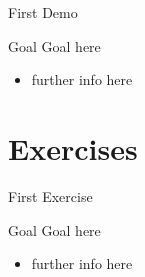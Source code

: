 \documentclass[presentation]{beamer}\mode<presentation>{\usetheme{AMSBolognaFC}}
\begin{document}
\begin{frame}{First Demo}
	\begin{block}{Goal}
		Goal here
	\end{block}
	\begin{itemize}
		\item further info here
	\end{itemize}
\end{frame}

\section{Exercises}

\begin{frame}{First Exercise}
	\begin{block}{Goal}
		Goal here
	\end{block}
	\begin{itemize}
		\item further info here
	\end{itemize}
\end{frame}

\section*{}

\frame{\titlepage}

\section*{\refname}

\begin{frame}[c,noframenumbering]{\refname}
	\scriptsize
	\nocite{*}
	
	
\end{frame}

\end{document}
